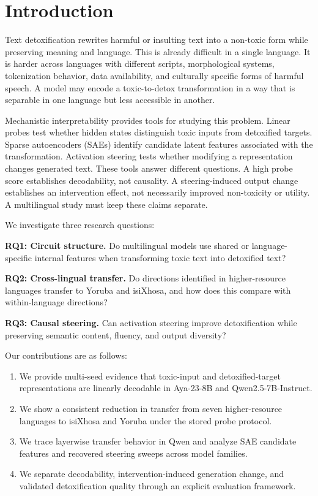 \section{Introduction}

Text detoxification rewrites harmful or insulting text into a non-toxic form while
preserving meaning and language. This is already difficult in a single language. It is
harder across languages with different scripts, morphological systems, tokenization
behavior, data availability, and culturally specific forms of harmful speech. A model
may encode a toxic-to-detox transformation in a way that is separable in one language
but less accessible in another.

Mechanistic interpretability provides tools for studying this problem. Linear probes
test whether hidden states distinguish toxic inputs from detoxified targets. Sparse
autoencoders (SAEs) identify candidate latent features associated with the
transformation. Activation steering tests whether modifying a representation changes
generated text. These tools answer different questions. A high probe score establishes
decodability, not causality. A steering-induced output change establishes an
intervention effect, not necessarily improved non-toxicity or utility. A multilingual
study must keep these claims separate.

We investigate three research questions:

\noindent\textbf{RQ1: Circuit structure.} Do multilingual models use shared or
language-specific internal features when transforming toxic text into detoxified text?

\noindent\textbf{RQ2: Cross-lingual transfer.} Do directions identified in
higher-resource languages transfer to Yoruba and isiXhosa, and how does this compare
with within-language directions?

\noindent\textbf{RQ3: Causal steering.} Can activation steering improve
detoxification while preserving semantic content, fluency, and output diversity?

Our contributions are as follows:
\begin{enumerate}[leftmargin=*]
    \item We provide multi-seed evidence that toxic-input and detoxified-target
    representations are linearly decodable in Aya-23-8B and Qwen2.5-7B-Instruct.
    \item We show a consistent reduction in transfer from seven higher-resource
    languages to isiXhosa and Yoruba under the stored probe protocol.
    \item We trace layerwise transfer behavior in Qwen and analyze SAE candidate
    features and recovered steering sweeps across model families.
    \item We separate decodability, intervention-induced generation change, and
    validated detoxification quality through an explicit evaluation framework.
\end{enumerate}
